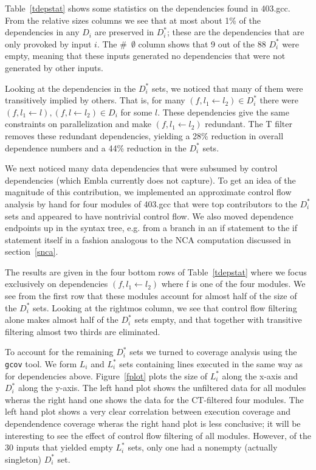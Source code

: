 \documentclass[times, 10pt,twocolumn]{article}
\begin{document}
Table~\ref{tdepstat} shows some statistics on the dependencies found
in 403.gcc. From the relative sizes columns we see that at most about 1\% of the 
dependencies in any $D_i$ are preserved in $D_i^{\ast}$; these are the dependencies 
that are only provoked by input $i$. The \#~$\emptyset$ column shows that 9 out of the
88 $D_i^{\ast}$ were empty, meaning that these inputs generated no dependencies
that were not generated by other inputs.

Looking at the dependencies in the $D_i^{\ast}$ sets, we noticed that many of them were 
transitively implied by others. That is, for many $(f, l_1 \leftarrow l_2) 
\in D_i^{\ast}$ there were $(f, l_1 \leftarrow l), (f, l \leftarrow l_2) \in D_i$ for some $l$.
These dependencies give the same constraints on parallelization and make $(f, l_1 \leftarrow l_2)$
redundant. The T filter removes these redundant dependencies, yielding a 28\% reduction in 
overall dependence numbers and a 44\% reduction in the $D_i^{\ast}$ sets.

We next noticed many data dependencies that were subsumed by control
dependencies (which Embla currently does not capture). To get an idea
of the magnitude of this contribution, we implemented an approximate
control flow analysis by hand for four modules of 403.gcc that were
top contributors to the $D_i^{\ast}$ sets and appeared to have
nontrivial control flow. We also moved dependence endpoints up in the
syntax tree, e.g. from a branch in an if statement to the if statement
itself in a fashion analogous to the NCA computation discussed in
section~\ref{snca}.

The results are given in the four bottom rows of Table~\ref{tdepstat}
where we focus exclusively on dependencies $(f,l_1 \leftarrow l_2)$ where f is
one of the four modules. We see from the first row that these modules
account for almost half of the size of the $D_i^{\ast}$ sets. Looking
at the rightmos column, we see that control flow filtering alone makes
almost half of the $D_i^{\ast}$ sets empty, and that together with
transitive filtering almost two thirds are eliminated.


\begin{figure*}
 
\caption{Coverage deltas (x-axis) versus dependence deltas (y-axis)
for no (left) or CT filtering} \label{fplot}
\end{figure*}

To account for the remaining $D_i^{\ast}$ sets we turned to coverage
analysis using the {\tt gcov} tool. We form $L_i$ and $L_i^{\ast}$
sets containing lines executed in the same way as for dependencies
above. Figure~\ref{fplot} plots the size of $L_i^{\ast}$ along the
x-axis and $D_i^{\ast}$ along the y-axis. The left hand plot shows the
unfiltered data for all modules wheras the right hand one shows the
data for the CT-filtered four modules. The left hand plot shows a very
clear correlation between execution coverage and dependendence
coverage wheras the right hand plot is less conclusive; it will be
interesting to see the effect of control flow filtering of all
modules. However, of the 30 inputs that yielded empty $L_i^{\ast}$ sets, only one
had a nonempty (actually singleton) $D_i^{\ast}$ set.
\end{document}
